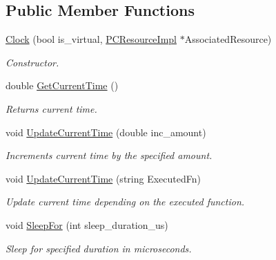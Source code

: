 \subsection*{Public Member Functions}
\begin{DoxyCompactItemize}
\item 
\hyperlink{classpc__emulator_1_1Clock_a512ea6e88d7df5ac3658cfb7e2206a3b}{Clock} (bool is\+\_\+virtual, \hyperlink{classpc__emulator_1_1PCResourceImpl}{P\+C\+Resource\+Impl} $\ast$Associated\+Resource)\hypertarget{classpc__emulator_1_1Clock_a512ea6e88d7df5ac3658cfb7e2206a3b}{}\label{classpc__emulator_1_1Clock_a512ea6e88d7df5ac3658cfb7e2206a3b}

\begin{DoxyCompactList}\small\item\em Constructor. \end{DoxyCompactList}\item 
double \hyperlink{classpc__emulator_1_1Clock_a17eec248287f3b57b699eea5b5a8e43f}{Get\+Current\+Time} ()\hypertarget{classpc__emulator_1_1Clock_a17eec248287f3b57b699eea5b5a8e43f}{}\label{classpc__emulator_1_1Clock_a17eec248287f3b57b699eea5b5a8e43f}

\begin{DoxyCompactList}\small\item\em Returns current time. \end{DoxyCompactList}\item 
void \hyperlink{classpc__emulator_1_1Clock_a4c54d7f36d90db5ddae81fca94d835c9}{Update\+Current\+Time} (double inc\+\_\+amount)\hypertarget{classpc__emulator_1_1Clock_a4c54d7f36d90db5ddae81fca94d835c9}{}\label{classpc__emulator_1_1Clock_a4c54d7f36d90db5ddae81fca94d835c9}

\begin{DoxyCompactList}\small\item\em Increments current time by the specified amount. \end{DoxyCompactList}\item 
void \hyperlink{classpc__emulator_1_1Clock_aa53deb20f779836ac4a9a629a1e5915a}{Update\+Current\+Time} (string Executed\+Fn)\hypertarget{classpc__emulator_1_1Clock_aa53deb20f779836ac4a9a629a1e5915a}{}\label{classpc__emulator_1_1Clock_aa53deb20f779836ac4a9a629a1e5915a}

\begin{DoxyCompactList}\small\item\em Update current time depending on the executed function. \end{DoxyCompactList}\item 
void \hyperlink{classpc__emulator_1_1Clock_afab6f601e53dab4ef79792e4e57d5247}{Sleep\+For} (int sleep\+\_\+duration\+\_\+us)\hypertarget{classpc__emulator_1_1Clock_afab6f601e53dab4ef79792e4e57d5247}{}\label{classpc__emulator_1_1Clock_afab6f601e53dab4ef79792e4e57d5247}

\begin{DoxyCompactList}\small\item\em Sleep for specified duration in microseconds. \end{DoxyCompactList}\end{DoxyCompactItemize}
